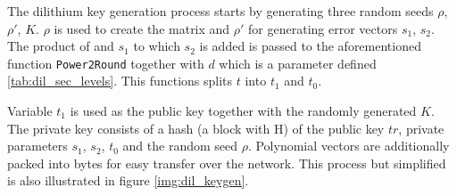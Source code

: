 The dilithium key generation process starts by generating three random seeds $\rho$, $\rho'$, $K$. $\rho$ is used to create the matrix  and $\rho'$ for generating error vectors $s_1$, $s_2$. The product of  and $s_1$ to which $s_2$ is added is passed to the aforementioned function \texttt{Power2Round} together with $d$ which is a parameter defined \ref{tab:dil_sec_levels}. This functions splits $t$ into $t_1$ and $t_0$.

Variable $t_1$ is used as the public key together with the randomly generated $K$. The private key consists of a hash (a block with H) of the public key $tr$, private parameters $s_1$, $s_2$, $t_0$ and the random seed $\rho$. Polynomial vectors are additionally packed into bytes for easy transfer over the network. This process but simplified is also illustrated in figure \ref{img:dil_keygen}.

